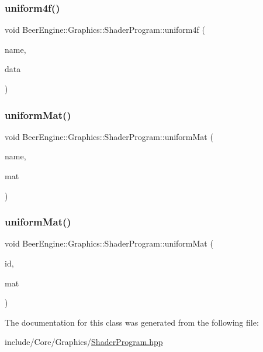 \subsubsection{\texorpdfstring{uniform4f()}{uniform4f()}\hspace{0.1cm}{\footnotesize\ttfamily [4/4]}}
{\footnotesize\ttfamily void Beer\+Engine\+::\+Graphics\+::\+Shader\+Program\+::uniform4f (\begin{DoxyParamCaption}\item[{std\+::string const \&}]{name,  }\item[{float $\ast$}]{data }\end{DoxyParamCaption})}

\mbox{\label{class_beer_engine_1_1_graphics_1_1_shader_program_aefc5f7af9799e46a5c9efc4a84c43915}} 
\subsubsection{\texorpdfstring{uniform\+Mat()}{uniformMat()}\hspace{0.1cm}{\footnotesize\ttfamily [1/2]}}
{\footnotesize\ttfamily void Beer\+Engine\+::\+Graphics\+::\+Shader\+Program\+::uniform\+Mat (\begin{DoxyParamCaption}\item[{std\+::string const \&}]{name,  }\item[{glm\+::mat4 \&}]{mat }\end{DoxyParamCaption})}

\mbox{\label{class_beer_engine_1_1_graphics_1_1_shader_program_a0269320ff9aab4c4834f4a66d77ae028}} 
\subsubsection{\texorpdfstring{uniform\+Mat()}{uniformMat()}\hspace{0.1cm}{\footnotesize\ttfamily [2/2]}}
{\footnotesize\ttfamily void Beer\+Engine\+::\+Graphics\+::\+Shader\+Program\+::uniform\+Mat (\begin{DoxyParamCaption}\item[{G\+Lint}]{id,  }\item[{glm\+::mat4 \&}]{mat }\end{DoxyParamCaption})}



The documentation for this class was generated from the following file\+:\begin{DoxyCompactItemize}
\item 
include/\+Core/\+Graphics/\mbox{\hyperlink{_shader_program_8hpp}{Shader\+Program.\+hpp}}\end{DoxyCompactItemize}
